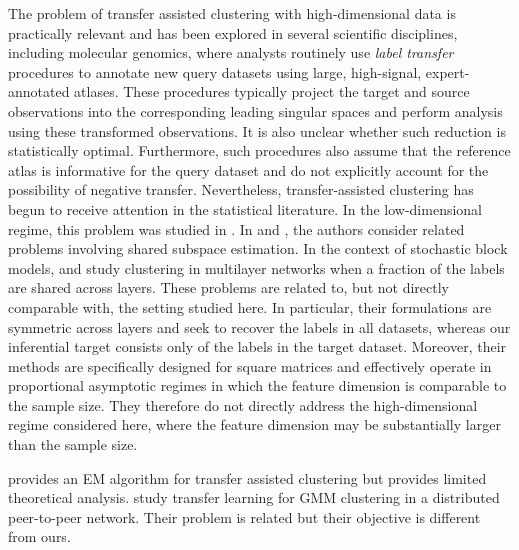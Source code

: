 \documentclass[10pt]{article}
\begin{document}
The problem of transfer assisted clustering with high-dimensional data is practically relevant and has been explored in several scientific disciplines, including molecular genomics, where analysts routinely use \emph{label transfer} procedures \citep{Stuart2019} to annotate new query datasets using large, high-signal, expert-annotated atlases. These procedures typically project the target and source observations into the corresponding leading singular spaces and perform analysis using these transformed observations. It is also unclear whether such reduction is statistically optimal. Furthermore, such procedures also assume that the reference atlas is informative for the query dataset and do not explicitly account for the possibility of negative transfer. Nevertheless, transfer-assisted clustering has begun to receive attention in the statistical literature. In the low-dimensional regime, this problem was studied in \cite{gu2026adaptive}. In \cite{ma2026optimal} and \cite{baharav2025stacked}, the authors consider related problems involving shared subspace estimation. In the context of stochastic block models, \cite{chen2022global} and \cite{yang2025fundamental} study clustering in multilayer networks when a fraction of the labels are shared across layers. These problems are related to, but not directly comparable with, the setting studied here. In particular, their formulations are symmetric across layers and seek to recover the labels in all datasets, whereas our inferential target consists only of the labels in the target dataset. Moreover, their methods are specifically designed for square matrices and effectively operate in proportional asymptotic regimes in which the feature dimension is comparable to the sample size. They therefore do not directly address the high-dimensional regime considered here, where the feature dimension may be substantially larger than the sample size.

\citet{wang_zhou} provides an EM algorithm for transfer assisted clustering but provides limited theoretical analysis. \citet{wang2023transfergmm} study transfer learning for GMM clustering in a distributed peer-to-peer network. Their problem is related but their objective is different from ours.
\end{document}
